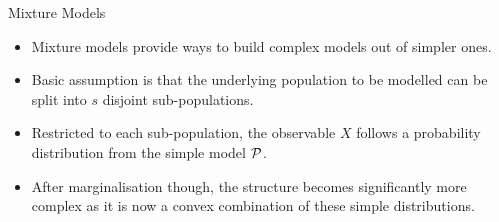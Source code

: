 \begin{frame}{Mixture Models}

    \begin{itemize}
    \item Mixture models provide ways to build complex models out of simpler ones.

    \item Basic assumption is that the underlying population to be modelled can be split into $s$ disjoint sub-populations.

    \item Restricted to each sub-population, the observable $X$ follows a probability distribution from the simple model $\mathcal{P}$.

    \item After marginalisation though, the structure becomes significantly more complex as it is now a convex combination of these simple distributions.

    \end{itemize}

\end{frame}

